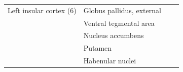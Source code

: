 \documentclass[12pt,aps,pra,reprint,showkeys]{revtex4-1}
\begin{document}
\begin{table}[p]
\begin{center}
\begin{tabular}{l l l l}
                      Left insular cortex (6) &         Globus pallidus, external &                      &                        \\
                                              &            Ventral tegmental area &                      &                        \\
                                              &                 Nucleus accumbens &                      &                        \\
                                              &                           Putamen &                      &                        \\
                                              &                  Habenular nuclei &                      &                        \\ \bottomrule
      \end{tabular}
    \end{center}
\end{table}
\end{document}
